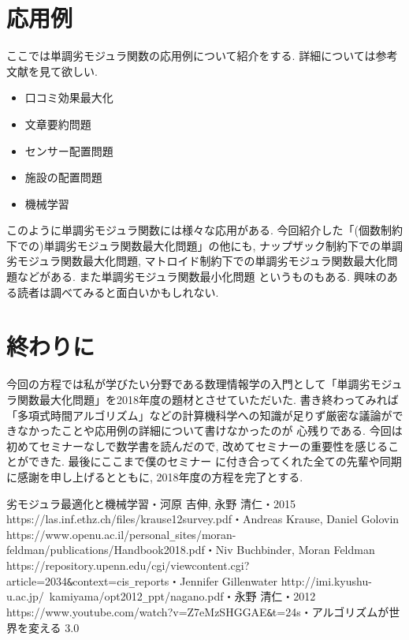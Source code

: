 \documentclass[11pt, a4paper, dvipdfmx]{jsarticle}
\theoremstyle{definition}
\begin{document}
\section{応用例}
ここでは単調劣モジュラ関数の応用例について紹介をする. 詳細については参考文献を見て欲しい.
\begin{itemize}
    \item 口コミ効果最大化
    \item 文章要約問題
    \item センサー配置問題
    \item 施設の配置問題
    \item 機械学習
\end{itemize}
このように単調劣モジュラ関数には様々な応用がある. 今回紹介した「(個数制約下での)単調劣モジュラ関数最大化問題」の他にも,
ナップザック制約下での単調劣モジュラ関数最大化問題, マトロイド制約下での単調劣モジュラ関数最大化問題などがある. また単調劣モジュラ関数最小化問題
というものもある. 興味のある読者は調べてみると面白いかもしれない.
\section{終わりに}
今回の方程では私が学びたい分野である数理情報学の入門として「単調劣モジュラ関数最大化問題」を2018年度の題材とさせていただいた. 
書き終わってみれば「多項式時間アルゴリズム」などの計算機科学への知識が足りず厳密な議論ができなかったことや応用例の詳細について書けなかったのが
心残りである. 今回は初めてセミナーなしで数学書を読んだので, 改めてセミナーの重要性を感じることができた. 最後にここまで僕のセミナー
に付き合ってくれた全ての先輩や同期に感謝を申し上げるとともに, 2018年度の方程を完了とする.






\begin{thebibliography}{10}
     劣モジュラ最適化と機械学習・河原 吉伸,  永野 清仁・2015
     https://las.inf.ethz.ch/files/krause12survey.pdf・Andreas Krause, Daniel Golovin
     https://www.openu.ac.il/personal\verb|_|sites/moran-feldman/publications/Handbook2018.pdf・Niv Buchbinder, Moran Feldman
     https://repository.upenn.edu/cgi/viewcontent.cgi?article=2034\verb|&|context=cis\verb|_|reports・Jennifer Gillenwater
     http://imi.kyushu-u.ac.jp/~kamiyama/opt2012\verb|_|ppt/nagano.pdf・永野 清仁・2012
     https://www.youtube.com/watch?v=Z7eMzSHGGAE\verb|&|t=24s・アルゴリズムが世界を変える 3.0
  \end{thebibliography}
\end{document}

